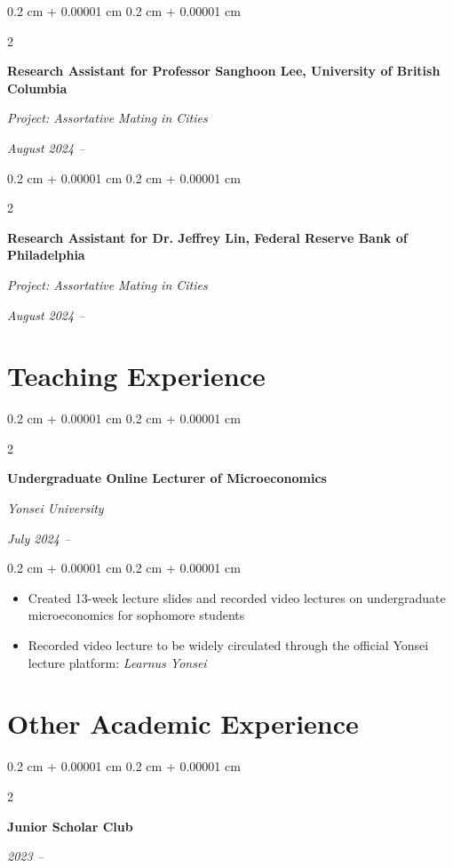 \documentclass[10pt, letterpaper]{article}
\newenvironment{highlights}{
	\begin{itemize}[
		topsep=0.10 cm,
		parsep=0.10 cm,
		partopsep=0pt,
		itemsep=0pt,
		leftmargin=0.4 cm + 10pt
		]
	}{
	\end{itemize}
} %
\newenvironment{onecolentry}{
	\begin{adjustwidth}{
			0.2 cm + 0.00001 cm
		}{
			0.2 cm + 0.00001 cm
		}
	}{
	\end{adjustwidth}
} %
\newenvironment{twocolentry}[2][]{
	\onecolentry
	\def\secondColumn{#2}
	\setcolumnwidth{\fill, 4.5 cm}
	\begin{paracol}{2}
	}{
		\switchcolumn \raggedleft \secondColumn
	\end{paracol}
	\endonecolentry
} %
\begin{document}
\vspace{12pt}
				\begin{twocolentry}{
			\textit{August 2024 –}    
			
			\textit{}}
		\textbf{Research Assistant for Professor Sanghoon Lee, University of British Columbia}
		
		\textit{Project: Assortative Mating in Cities}
	\end{twocolentry}
	
\vspace{12pt}

					\begin{twocolentry}{
			\textit{August 2024 –}    
			
			\textit{}}
		\textbf{Research Assistant for Dr. Jeffrey Lin, Federal Reserve Bank of Philadelphia}
		
		\textit{Project: Assortative Mating in Cities}
	\end{twocolentry}
	
	
	
	\section{Teaching Experience}
		\begin{twocolentry}{
			\textit{July 2024 –}    
			
			\textit{}}
		\textbf{Undergraduate Online Lecturer of Microeconomics}
		
		\textit{Yonsei University}
	\end{twocolentry}
	
	\vspace{0.10 cm}
	\begin{onecolentry}
		\begin{highlights}
			\item Created 13-week lecture slides and recorded video lectures on undergraduate microeconomics for sophomore students
			\item Recorded video lecture to be widely circulated through the official Yonsei lecture platform: \textit{Learnus Yonsei}
		\end{highlights}
	\end{onecolentry}
	
	
\section{Other Academic Experience}
	
	\begin{twocolentry}{
			
			
			\textit{2023 –}}
		\textbf{Junior Scholar Club}
	\end{twocolentry}
	
\end{document}
